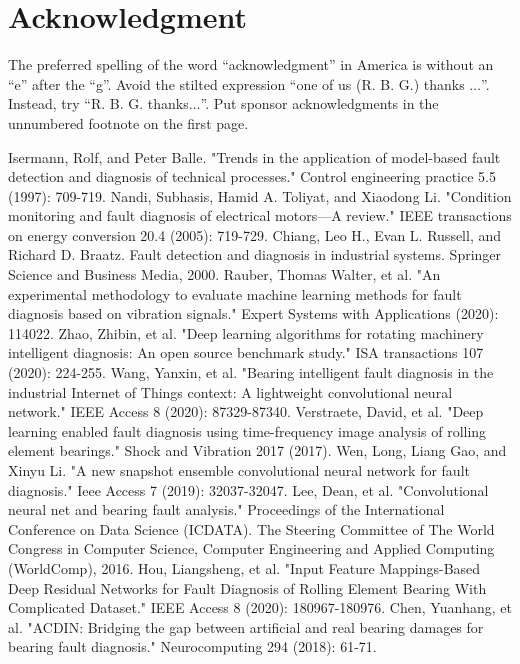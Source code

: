 \documentclass[conference]{IEEEtran}
\begin{document}
\section*{Acknowledgment}

The preferred spelling of the word ``acknowledgment'' in America is without 
an ``e'' after the ``g''. Avoid the stilted expression ``one of us (R. B. 
G.) thanks $\ldots$''. Instead, try ``R. B. G. thanks$\ldots$''. Put sponsor 
acknowledgments in the unnumbered footnote on the first page.


\begin{thebibliography}{00}
 Isermann, Rolf, and Peter Balle. "Trends in the application of model-based fault detection and diagnosis of technical processes." Control engineering practice 5.5 (1997): 709-719.
 Nandi, Subhasis, Hamid A. Toliyat, and Xiaodong Li. "Condition monitoring and fault diagnosis of electrical motors—A review." IEEE transactions on energy conversion 20.4 (2005): 719-729.
 Chiang, Leo H., Evan L. Russell, and Richard D. Braatz. Fault detection and diagnosis in industrial systems. Springer Science and Business Media, 2000.
 Rauber, Thomas Walter, et al. "An experimental methodology to evaluate machine learning methods for fault diagnosis based on vibration signals." Expert Systems with Applications (2020): 114022.
 Zhao, Zhibin, et al. "Deep learning algorithms for rotating machinery intelligent diagnosis: An open source benchmark study." ISA transactions 107 (2020): 224-255.
 Wang, Yanxin, et al. "Bearing intelligent fault diagnosis in the industrial Internet of Things context: A lightweight convolutional neural network." IEEE Access 8 (2020): 87329-87340.
 Verstraete, David, et al. "Deep learning enabled fault diagnosis using time-frequency image analysis of rolling element bearings." Shock and Vibration 2017 (2017).
 Wen, Long, Liang Gao, and Xinyu Li. "A new snapshot ensemble convolutional neural network for fault diagnosis." Ieee Access 7 (2019): 32037-32047.
 Lee, Dean, et al. "Convolutional neural net and bearing fault analysis." Proceedings of the International Conference on Data Science (ICDATA). The Steering Committee of The World Congress in Computer Science, Computer Engineering and Applied Computing (WorldComp), 2016.
 Hou, Liangsheng, et al. "Input Feature Mappings-Based Deep Residual Networks for Fault Diagnosis of Rolling Element Bearing With Complicated Dataset." IEEE Access 8 (2020): 180967-180976.
 Chen, Yuanhang, et al. "ACDIN: Bridging the gap between artificial and real bearing damages for bearing fault diagnosis." Neurocomputing 294 (2018): 61-71.

\end{thebibliography}
\end{document}
